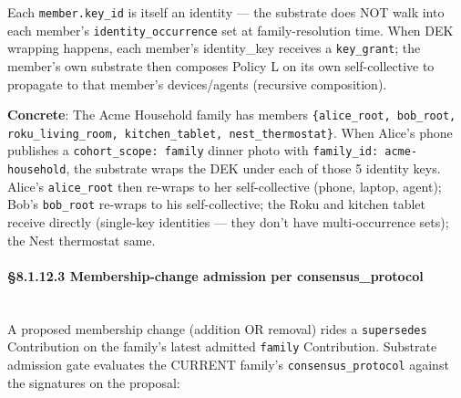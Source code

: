 \documentclass[10pt]{article}
\begin{document}
Each \texttt{member.key\_id} is itself an identity — the substrate does NOT walk into each member's \texttt{identity\_occurrence} set at family-resolution time. When DEK wrapping happens, each member's identity\_key receives a \texttt{key\_grant}; the member's own substrate then composes Policy L on its own self-collective to propagate to that member's devices/agents (recursive composition).


\textbf{Concrete}: The Acme Household family has members \texttt{\{alice\_root, bob\_root, roku\_living\_room, kitchen\_tablet, nest\_thermostat\}}. When Alice's phone publishes a \texttt{cohort\_scope: family} dinner photo with \texttt{family\_id: acme-household}, the substrate wraps the DEK under each of those 5 identity keys. Alice's \texttt{alice\_root} then re-wraps to her self-collective (phone, laptop, agent); Bob's \texttt{bob\_root} re-wraps to his self-collective; the Roku and kitchen tablet receive directly (single-key identities — they don't have multi-occurrence sets); the Nest thermostat same.


\paragraph{§8.1.12.3 Membership-change admission per consensus\_protocol}\mbox{}\\


A proposed membership change (addition OR removal) rides a \texttt{supersedes} Contribution on the family's latest admitted \texttt{family} Contribution. Substrate admission gate evaluates the CURRENT family's \texttt{consensus\_protocol} against the signatures on the proposal:
\end{document}
